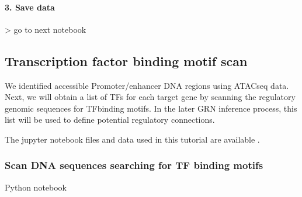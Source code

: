 \documentclass[letterpaper,10pt,english]{sphinxmanual}
\begin{document}
\paragraph{3. Save data}
\label{\detokenize{notebooks/01_ATAC-seq_data_processing/option2_Bulk_ATAC-seq_data/01_preprocess_Bulk_ATAC_seq_peak_data:3.-Save-data}}
{
\begin{sphinxVerbatim}[commandchars=\\\{\}]
\llap{\color{nbsphinxin}[10]:\,\hspace{\fboxrule}\hspace{\fboxsep}}
\end{sphinxVerbatim}
}

\sphinxhyphen{}\textgreater{} go to next notebook


\subsection{Transcription factor binding motif scan}
\label{\detokenize{tutorials/motifscan:transcription-factor-binding-motif-scan}}\label{\detokenize{tutorials/motifscan:motifscan}}\label{\detokenize{tutorials/motifscan::doc}}
We identified accessible Promoter/enhancer DNA regions using ATAC\sphinxhyphen{}seq data.
Next, we will obtain a list of TFs for each target gene by scanning the regulatory genomic sequences for TF\sphinxhyphen{}binding motifs.
In the later GRN inference process, this list will be used to define potential regulatory connections.

The jupyter notebook files and data used in this tutorial are available  .


\subsubsection{Scan DNA sequences searching for TF binding motifs}
\label{\detokenize{tutorials/motifscan:scan-dna-sequences-searching-for-tf-binding-motifs}}
Python notebook
\end{document}
